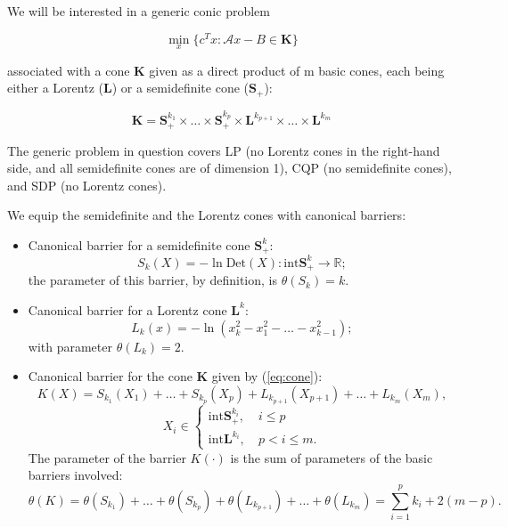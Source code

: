\documentclass[11pt,a4paper]{article}
\newcommand{\R}{\mathbb{R}}
\begin{document}
We will be interested in a generic conic problem

\begin{equation}
    \underset{x}{\min} \{c^Tx : \mathcal{A}x-B \in \textbf{K}\} \tag{CP}
\end{equation}

associated with a cone $\textbf{K}$ given as a direct product of m basic cones, each being either a Lorentz ($\textbf{L}$) or a semidefinite cone ($\textbf{S}_{+}$):

\begin{equation*}\label{eq:cone}
    \textbf{K} = \textbf{S}_+^{k_1}\times\dots\times\textbf{S}_+^{k_p}\times\textbf{L}^{k_{p+1}}\times\dots\times\textbf{L}^{k_{m}} \tag{Cone}
\end{equation*}

The generic problem in question covers LP (no Lorentz cones in the right-hand side, and all semidefinite cones are of dimension 1), CQP (no semidefinite cones), and SDP (no Lorentz cones).

We equip the semidefinite and the Lorentz cones with canonical barriers:

\begin{itemize}
    \item Canonical barrier for a semidefinite cone $\textbf{S}_+^k$: 
    \begin{equation*}
        S_k(X) = -\ln \text{Det}(X) : \text{int} \textbf{S}_+^k \to \R;
    \end{equation*}
the parameter of this barrier, by definition, is $\theta(S_k)=k$.
    \item Canonical barrier for a Lorentz cone $\textbf{L}^k$:
    \begin{equation*}
        L_k(x) = -\ln(x_k^2-x_1^2-\dots -x_{k-1}^2);
    \end{equation*}
    with parameter $\theta(L_k) = 2$.
    \item Canonical barrier for the cone $\textbf{K}$ given by (\ref{eq:cone}):
    \begin{equation*}
        K(X) = S_{k_1}(X_1)+\dots+S_{k_p}(X_p)+L_{k_{p+1}}(X_{p+1})+\dots+L_{k_{m}}(X_{m}),
    \end{equation*}
    \begin{equation*}
        X_i \in 
        \begin{cases}
          \text{int}\textbf{S}_+^{k_i}, & \ i\leq p \\
          \text{int}\textbf{L}^{k_i}, & \ p<i\leq m.
        \end{cases}
    \end{equation*}
    The parameter of the barrier $K(\cdot)$ is the sum of parameters of the basic barriers involved:
    \begin{equation*}
        \theta(K) = \theta(S_{k_1})+\dots+\theta(S_{k_p})+\theta(L_{k_{p+1}})+\dots+\theta(L_{k_{m}}) = \overset{p}{\underset{i=1}{\sum}} k_i + 2(m-p).
    \end{equation*}
\end{itemize}
\end{document}
